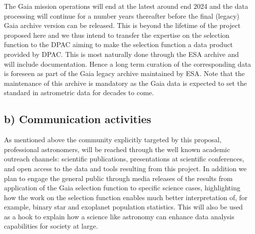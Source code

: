 The Gaia mission operations will end at the latest around end 2024 and the data processing will continue for a number years thereafter before the final (legacy) Gaia archive version can be released. This is beyond the lifetime of the project proposed here and we thus intend to transfer the expertise on the selection function to the DPAC aiming to make the selection function a data product provided by DPAC. This is most naturally done through the ESA archive and will include documentation. Hence a long term curation of the corresponding data is foreseen as part of the Gaia legacy archive maintained by ESA. Note that the maintenance of this archive is mandatory as the Gaia data is expected to set the standard in astrometric data for decades to come. 

\subsection{b) Communication activities}
\label{sec:communication-activities}

As mentioned above the community explicitly targeted by this proposal, professional astronomers, will be reached through the well known academic outreach channels: scientific publications, presentations at scientific conferences, and open access to the data and tools resulting from this project. In addition we plan to engage the general public through media releases of the results from application of the Gaia selection function to specific science cases, highlighting how the work on the selection function enables much better interpretation of, for example, binary star and exoplanet population statistics. This will also be used as a hook to explain how a science like astronomy can enhance data analysis capabilities for society at large. 
